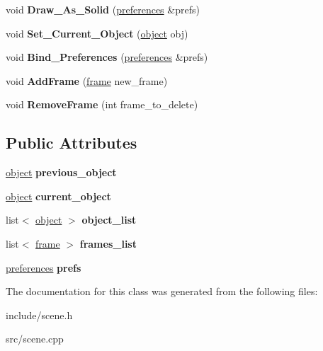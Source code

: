 \begin{DoxyCompactItemize}
\item 
\mbox{\label{classscene_a480dc2b8f70cc7d275b980c29c5d5aac}} 
void {\bfseries Draw\+\_\+\+As\+\_\+\+Solid} (\hyperlink{classpreferences}{preferences} \&prefs)
\item 
\mbox{\label{classscene_a1b9ed81ba7958f46c09f36bb9afba0ac}} 
void {\bfseries Set\+\_\+\+Current\+\_\+\+Object} (\hyperlink{classobject}{object} obj)
\item 
\mbox{\label{classscene_a8852a907f1b5f68d1c3b5ee16b01708c}} 
void {\bfseries Bind\+\_\+\+Preferences} (\hyperlink{classpreferences}{preferences} \&prefs)
\item 
\mbox{\label{classscene_a84031d1ae7a170a10fb83d73d145b2d8}} 
void {\bfseries Add\+Frame} (\hyperlink{classframe}{frame} new\+\_\+frame)
\item 
\mbox{\label{classscene_a6e06c70defb5fee5b239b0a462b2e0b8}} 
void {\bfseries Remove\+Frame} (int frame\+\_\+to\+\_\+delete)
\end{DoxyCompactItemize}
\subsection*{Public Attributes}
\begin{DoxyCompactItemize}
\item 
\mbox{\label{classscene_add52d6146168972574c87b8a883a9ecb}} 
\hyperlink{classobject}{object} {\bfseries previous\+\_\+object}
\item 
\mbox{\label{classscene_a35bb04fc9a7c8bd7730a3bde95ccd0b4}} 
\hyperlink{classobject}{object} {\bfseries current\+\_\+object}
\item 
\mbox{\label{classscene_a55d5708abccd35853c9e6b9197729983}} 
list$<$ \hyperlink{classobject}{object} $>$ {\bfseries object\+\_\+list}
\item 
\mbox{\label{classscene_a7136213b92987890fb721bfedf4ee403}} 
list$<$ \hyperlink{classframe}{frame} $>$ {\bfseries frames\+\_\+list}
\item 
\mbox{\label{classscene_af53c77a998e7270af27abc27eeb06035}} 
\hyperlink{classpreferences}{preferences} {\bfseries prefs}
\end{DoxyCompactItemize}


The documentation for this class was generated from the following files\+:\begin{DoxyCompactItemize}
\item 
include/scene.\+h\item 
src/scene.\+cpp\end{DoxyCompactItemize}
